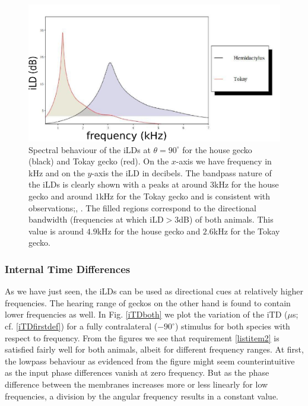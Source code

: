 \begin{figure}[ht!]
\centering
  \includegraphics[width=.6\linewidth]{Diagrams/Plots/iLD/iLDspectrumboth2.png}
  \caption[Spectral behavior of the iLDs.]{Spectral behaviour of the iLDs at $\theta=90^\circ$ for the house gecko (black) and Tokay gecko (red). On the $x$-axis we have frequency in kHz and on the $y$-axis the iLD in decibels.
  The bandpass nature of the iLDs is clearly shown with a peaks at around $3$kHz for the house gecko and around $1$kHz for the Tokay gecko and is consistent with observations;\cite{dalsgaardmanley1}, \cite{dalsgaardmanley2}. The
  filled regions correspond to the directional bandwidth (frequencies at which iLD$>$3dB) of both animals. This value is around $4.9$kHz for the house gecko and $2.6$kHz
  for the Tokay gecko.}
  \label{iLDspectrum}
\end{figure}

\subsubsection{Internal Time Differences}
As we have just seen, the iLDs can be used as directional cues at relatively higher frequencies. The hearing range of geckos
on the other hand is found to contain lower frequencies as well. In Fig. \ref{iTDboth} we plot the variation of the iTD ($\mu$s; cf. \eqref{iTDfirstdef}) for 
a fully contralateral ($-90^\circ$) stimulus for both species with respect to frequency. From the figures we see that requirement \ref{listitem2} is satisfied fairly
well for both animals, albeit for different frequency ranges. At first, the lowpass behaviour as evidenced from the figure might seem counterintuitive as the
input phase differences vanish at zero frequency. But as the phase difference between the membranes increases more or less linearly for low frequencies,
a division by the angular frequency results in a constant value.

